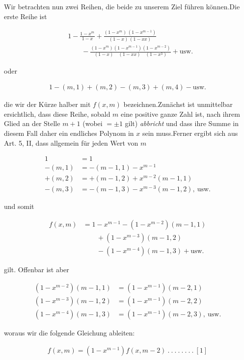 \clearpage{}

Wir betrachten nun zwei Reihen, die beide zu unserem Ziel führen können.\quad Die erste Reihe ist

\[
\begin{aligned}
&1-\frac{1-x^m}{1-x}+\frac{(1-x^m)\,(1-x^{m-1})}{(1-x)\,(1-xx)}\\
&\qquad-\frac{(1-x^m)(1-x^{m-1})(1-x^{m-2})}{(1-x)\quad(1-xx)\quad(1-x^3)}+\text{usw.}
\end{aligned}
\]

oder

\[
\begin{aligned}
1-(m,1)+(m,2)-(m,3)+(m,4)-\text{usw.}
\end{aligned}
\]

die wir der Kürze halber mit $f(x,m)$ bezeichnen.\quad Zunächst ist unmittelbar ersichtlich, dass diese Reihe, sobald $m$ eine positive ganze Zahl ist, nach ihrem Glied an der Stelle $m+1$ (wobei $=\pm1$ gilt) \emph{abbricht} und dass ihre Summe in diesem Fall daher ein endliches Polynom in $x$ sein muss.\quad Ferner ergibt sich aus Art. 5, II, dass allgemein für jeden Wert von $m$

\[
\begin{aligned}
1&=1\\
-(m,1)&=-(m-1,1)-x^{m-1}\\
+(m,2)&=+(m-1,2)+x^{m-2}(m-1,1)\\
-(m,3)&=-(m-1,3)-x^{m-3}(m-1,2),\ \text{usw.}
\end{aligned}
\]

und somit

\[
\begin{aligned}
f(x,m)&=1-x^{m-1}-(1-x^{m-2})(m-1,1)\\
&\qquad+(1-x^{m-3})(m-1,2)\\
&\qquad-(1-x^{m-4})(m-1,3)+\text{usw.}
\end{aligned}
\]

gilt. Offenbar ist aber

\[
\begin{aligned}
(1-x^{m-2})(m-1,1)&=(1-x^{m-1})(m-2,1)\\
(1-x^{m-3})(m-1,2)&=(1-x^{m-1})(m-2,2)\\
(1-x^{m-4})(m-1,3)&=(1-x^{m-1})(m-2,3),\ \text{usw.}
\end{aligned}
\]

woraus wir die folgende Gleichung ableiten:

\[
\begin{aligned}
f(x,m)=(1-x^{m-1})f(x,m-2)\ .\ .\ .\ .\ .\ .\ .\ .\ [1]
\end{aligned}
\]

